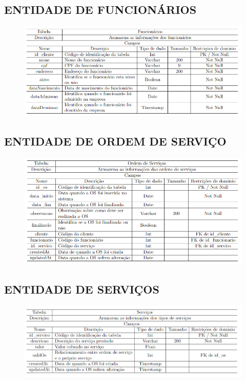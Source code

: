 \subsection{ENTIDADE DE FUNCIONÁRIOS}
\begin{figure}[htb]
	\begin{center}
	    \includegraphics[width=1\linewidth]{imagens/dc2.png}
	\end{center}
\end{figure}

\newpage

\subsection{ENTIDADE DE ORDEM DE SERVIÇO}
\begin{figure}[htb]
	\begin{center}
	    \includegraphics[width=1\linewidth]{imagens/dc3.png}
	\end{center}
\end{figure}


\subsection{ENTIDADE DE SERVIÇOS}
\begin{figure}[htb]
	\begin{center}
	    \includegraphics[width=1\linewidth]{imagens/dc4.png}
	\end{center}
\end{figure}

